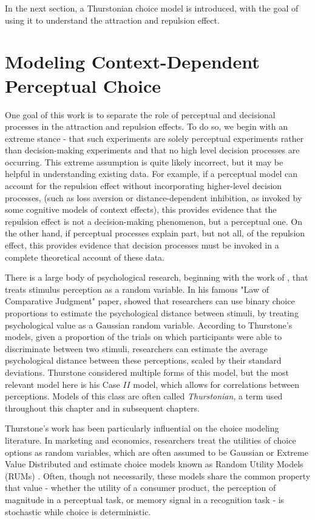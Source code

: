 In the next section, a Thurstonian choice model is introduced, with the goal of using it to understand the attraction and repulsion effect. 

\section{Modeling Context-Dependent Perceptual Choice}

One goal of this work is to separate the role of perceptual and decisional processes in the attraction and repulsion effects. To do so, we begin with an extreme stance - that such experiments are solely perceptual experiments rather than decision-making experiments and that no high level decision processes are occurring. This extreme assumption is quite likely incorrect, but it may be helpful in understanding existing data. For example, if a perceptual model can account for the repulsion effect without incorporating higher-level decision processes, (such as loss aversion or distance-dependent inhibition, as invoked by some cognitive models of context effects), this provides evidence that the repulsion effect is not a decision-making phenomenon, but a perceptual one. On the other hand, if perceptual processes explain part, but not all, of the repulsion effect, this provides evidence that decision processes must be invoked in a complete theoretical account of these data.

There is a large body of psychological research, beginning with the work of \textcite{thurstone1927law}, that treats stimulus perception as a random variable. In his famous "Law of Comparative Judgment" paper, \textcite{thurstone1927law} showed that researchers can use binary choice proportions to estimate the psychological distance between stimuli, by treating psychological value as a Gaussian random variable. According to Thurstone's models, given a proportion of the trials on which participants were able to discriminate between two stimuli, researchers can estimate the average psychological distance between these perceptions, scaled by their standard deviations. Thurstone considered multiple forms of this model, but the most relevant model here is his Case $II$ model, which allows for correlations between perceptions. Models of this class are often called \textit{Thurstonian}, a term used throughout this chapter and in subsequent chapters.

Thurstone's work has been particularly influential on the choice modeling literature. In marketing and economics, researchers treat the utilities of choice options as random variables, which are often assumed to be Gaussian or Extreme Value Distributed and estimate choice models known as Random Utility Models (RUMs) \parencite{mcfadden2001economic,train2009discrete}. Often, though not necessarily, these models share the common property that value - whether the utility of a consumer product, the perception of magnitude in a perceptual task, or memory signal in a recognition task - is stochastic while choice is deterministic.

